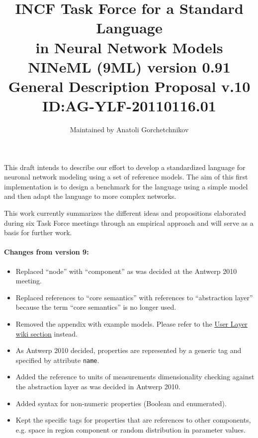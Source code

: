 \documentclass{article}
\title{INCF Task Force for a Standard Language\\in Neural Network Models\\
\vskip 0.35in
\Large{\bf NINeML (9ML) version 0.91 General Description}
\vskip 0.15in
\Large{Proposal v.10 ID:AG-YLF-20110116.01}}
\author{Maintained by Anatoli Gorchetchnikov}
\begin{document}
\maketitle

\abstract
This draft intends to describe our effort to develop a standardized language
for neuronal network modeling using a set of reference models. The aim of this
first implementation is to design a benchmark for the language using a simple
model and then adapt the language to more complex networks.

This work currently summarizes the different ideas and propositions elaborated
during six Task Force meetings through an empirical approach and will serve
as a basis for further work.

\paragraph{Changes from version 9:}
\begin{itemize}
\item Replaced ``node'' with ``component'' as was decided at the Antwerp 2010 meeting.
\item Replaced references to ``core semantics'' with references to ``abstraction layer''
because the term ``core semantics'' is no longer used.
\item Removed the appendix with example models. Please refer to the
\href{http://www.incf.org/core/programs/modeling/wiki/documentation/user-layer}
{\underline{User Layer wiki section}} instead.
\item As Antwerp 2010 decided, properties are represented by a generic tag and specified
by attribute {\tt name}.
\item Added the reference to units of measurements dimensionality checking against
the abstraction layer as was decided in Antwerp 2010.
\item Added syntax for non-numeric properties (Boolean and enumerated).
\item Kept the specific tags for properties that are references to other components,
e.g. space in region component or random distribution in parameter values.
\end{itemize}
\end{document}
